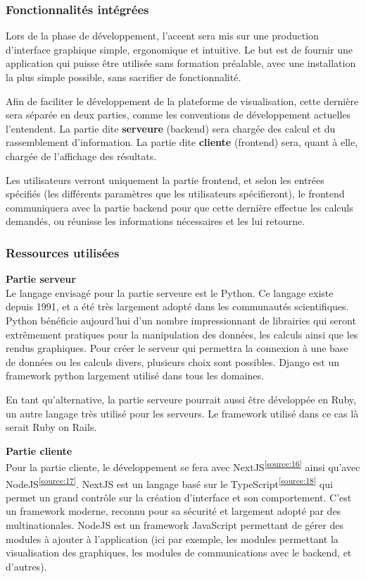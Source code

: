 \subsubsection{Fonctionnalités intégrées}
Lors de la phase de développement, l'accent sera mis sur une production d'interface graphique simple, ergonomique et intuitive.
Le but est de fournir une application qui puisse être utilisée sans formation préalable, avec une installation la plus simple possible, sans sacrifier de fonctionnalité.

Afin de faciliter le développement de la plateforme de visualisation, cette dernière sera séparée en deux parties, comme les conventions de développement actuelles l'entendent. 
La partie dite \textbf{serveure} (backend) sera chargée des calcul et du rassemblement d'information. 
La partie dite \textbf{cliente} (frontend) sera, quant à elle, chargée de l'affichage des résultats.

Les utilisateurs verront uniquement la partie frontend, et selon les entrées spécifiés (les différents paramètres que les utilisateurs spécifieront), le frontend communiquera avec la partie backend pour que cette dernière effectue les calculs demandés, ou réunisse les informations nécessaires et les lui retourne.

\subsubsection{Ressources utilisées}

\textbf{Partie serveur} \\
Le langage envisagé pour la partie serveure est le Python.
Ce langage existe depuis 1991, et a été très largement adopté dans les communautés scientifiques.
Python bénéficie aujourd'hui d'un nombre impressionnant de librairies qui seront extrêmement pratiques pour la manipulation des données, les calculs ainsi que les rendus graphiques.
Pour créer le serveur qui permettra la connexion à une base de données ou les calculs divers, plusieurs choix sont possibles.
Django est un framework python largement utilisé dans tous les domaines.

En tant qu'alternative, la partie serveure pourrait aussi être développée en Ruby, un autre langage très utilisé pour les serveurs.
Le framework utilisé dans ce cas là serait Ruby on Rails.

\textbf{Partie cliente} \\
Pour la partie cliente, le développement se fera avec NextJS\textsuperscript{\ref{source:16}} ainsi qu'avec NodeJS\textsuperscript{\ref{source:17}}.
NextJS est un langage basé sur le TypeScript\textsuperscript{\ref{source:18}} qui permet un grand contrôle sur la création d'interface et son comportement.
C'est un framework moderne, reconnu pour sa sécurité et largement adopté par des multinationales.
NodeJS est un framework JavaScript permettant de gérer des modules à ajouter à l'application (ici par exemple, les modules permettant la visualisation des graphiques, les modules de communications avec le backend, et d'autres).

